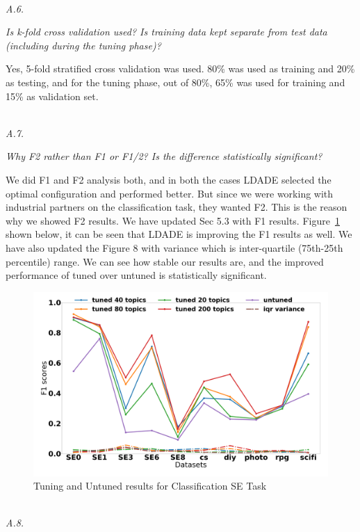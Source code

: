 \documentclass[conference]{IEEEtran}
\begin{document}
\noindent
\textit{\\A.6.} 

\textit{Is k-fold cross validation used?  Is training data kept separate from test data (including during the tuning phase)? \\}

Yes, 5-fold stratified cross validation was used. 80\% was used as training and 20\% as testing, and for the tuning phase, out of 80\%, 65\% was used for training and 15\% as validation set.

\noindent
\textit{\\A.7.}  

\textit{Why F2 rather than F1 or F1/2? Is the difference statistically significant? \\}

 We did F1 and F2 analysis both, and in both the cases LDADE selected the optimal configuration and performed better. But since we were working with industrial partners on the classification task, they wanted F2. This is the reason why we showed F2 results. We have updated Sec 5.3 with F1 results. Figure~\ref{fig:f1} shown below, it can be seen that LDADE is improving the F1 results as well. We have also updated the Figure 8 with variance which is inter-quartile (75th-25th percentile) range. We can see how stable our results are, and the improved performance of tuned over untuned is statistically significant.

\begin{figure}[!htbp]
  \includegraphics[width=\linewidth]{./fig/F1.png}
  \caption{Tuning and Untuned results for Classification SE Task}
  \label{fig:f1}
\end{figure}

\noindent
\textit{\\A.8.}  
\end{document}
